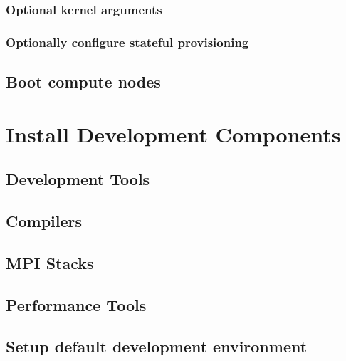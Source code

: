\documentclass[letterpaper]{article}
\begin{document}
\vspace*{-0.2cm}
\subsubsection{Optional kernel arguments} \label{sec:optional_kargs}



\vspace*{-0.2cm}
\subsubsection{Optionally configure stateful provisioning}


\subsection{Boot compute nodes} \label{sec:boot_computes}



\section{Install \OHPC{} Development Components}


\subsection{Development Tools} \label{sec:install_dev_tools}


\subsection{Compilers} \label{sec:install_compilers}


\subsection{MPI Stacks} \label{sec:mpi}


\subsection{Performance Tools} \label{sec:install_perf_tools}



\subsection{Setup default development environment}

\end{document}

